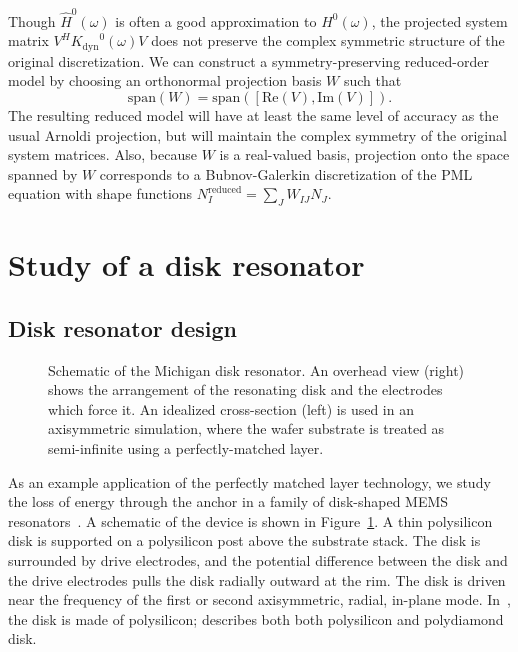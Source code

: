 \documentclass{article}
\newcommand{\sspan}{\mathrm{span}}
\newcommand{\Kdynamic}{\ensuremath{K_{\mathrm{dyn}}}}
\renewcommand{\Re}{\mathrm{Re}}
\renewcommand{\Im}{\mathrm{Im}}
\begin{document}
Though $\hat{H}^0(\omega)$ is often a good approximation to
$H^0(\omega)$, the projected system matrix $V^H \Kdynamic^0(\omega) V$
does not preserve the complex symmetric structure of the original
discretization.  We can construct a symmetry-preserving reduced-order
model by choosing an orthonormal projection basis $W$ such that
\begin{equation}
  \sspan(W) = \sspan([\Re(V), \Im(V)]).
\end{equation}
The resulting reduced model will have at least the same level of
accuracy as the usual Arnoldi projection, but will maintain the
complex symmetry of the original system matrices.  Also, because $W$
is a real-valued basis, projection onto the space spanned by $W$
corresponds to a Bubnov-Galerkin discretization of the PML equation
with shape functions $N_I^\mathrm{reduced} = \sum_J W_{IJ} N_J$.


\section{Study of a disk resonator}

\subsection{Disk resonator design}

\begin{figure}
  \begin{center}
    \scalebox{0.5}{}
  \end{center}
  \caption{Schematic of the Michigan disk resonator.  An overhead view
           (right) shows the arrangement of the resonating disk and
           the electrodes which force it.  An idealized cross-section (left)
           is used in an axisymmetric simulation, where the wafer substrate
           is treated as semi-infinite using a perfectly-matched layer.}
  \label{michfig}
\end{figure}

As an example application of the perfectly matched layer technology,
we study the loss of energy through the anchor in a family of
disk-shaped MEMS resonators~\cite{Wang:2003:SAG,Wang:2004:GND}.  A
schematic of the device is shown in Figure~\ref{michfig}.  A thin
polysilicon disk is supported on a polysilicon post above the
substrate stack.  The disk is surrounded by drive electrodes, and the
potential difference between the disk and the drive electrodes pulls
the disk radially outward at the rim.  The disk is driven near the
frequency of the first or second axisymmetric, radial, in-plane mode.
In~\cite{Wang:2003:SAG}, the disk is made of polysilicon;
\cite{Wang:2004:GND} describes both both polysilicon and polydiamond disk.
\end{document}

